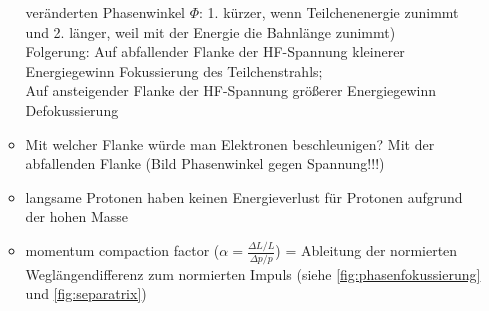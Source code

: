 \documentclass[11pt,a4paper]{article}
\begin{document}
\begin{itemize}
\begin{itemize}
                veränderten Phasenwinkel \(\Phi\): 1. kürzer, wenn Teilchenenergie zunimmt und 2. länger, weil mit der Energie die 
                Bahnlänge zunimmt) \\
                \Rightarrow Folgerung: Auf abfallender Flanke der HF-Spannung \rightarrow kleinerer Energiegewinn \rightarrow Fokussierung 
                des Teilchenstrahls; \\
                Auf ansteigender Flanke der HF-Spannung \rightarrow größerer Energiegewinn \rightarrow Defokussierung 
                \item Mit welcher Flanke würde man Elektronen beschleunigen? Mit der abfallenden Flanke (Bild Phasenwinkel gegen Spannung!!!)
                \item langsame Protonen haben keinen Energieverlust für Protonen aufgrund der hohen Masse 
                \item momentum compaction factor (\( \alpha = \frac{\Delta L /L}{\Delta p /p} \)) = Ableitung der normierten 
                Weglängendifferenz zum normierten Impuls (siehe \ref{fig:phasenfokussierung} und \ref{fig:separatrix})
            \end{itemize}


\end{itemize}
\end{document}
